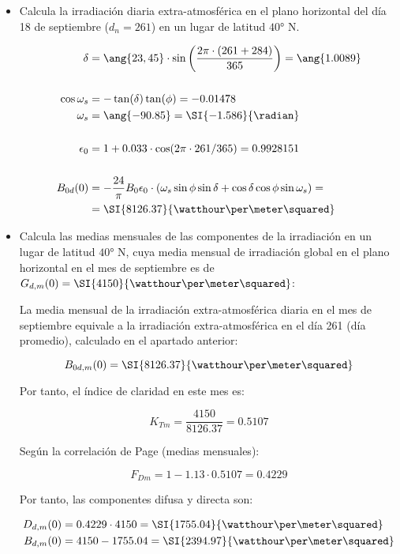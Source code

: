 \begin{itemize}
\item Calcula la irradiación diaria extra-atmosférica en el plano
  horizontal del día 18 de septiembre ($d_n = 261$) en un lugar de
  latitud $\ang{40}$ N.

\begin{align*}
  \delta &= \ang{23,45}\cdot\sin\left(\frac{2\pi\cdot\left(261+284\right)}{365}\right) = \ang{1.0089}\\
  \\
  \cos \omega_s &= -\tan(\delta) \tan(\phi) = -0.01478\\
  \omega_s &= \ang{-90.85} = \SI{-1.586}{\radian}\\
  \\
  \epsilon_0 &= 1+0.033\cdot\cos(2\pi\cdot261/365) = 0.9928151\\
  \\
  B_{0d}(0) &= -\frac{24}{\pi}B_{0}\epsilon_{0}\cdot\left(\omega_{s}\sin\phi\sin\delta+\cos\delta\cos\phi\sin\omega_{s}\right) = \\
         &= \SI{8126.37}{\watthour\per\meter\squared}
\end{align*}

\item Calcula las medias mensuales de las componentes de la
  irradiación en un lugar de latitud $\ang{40}$ N, cuya media mensual
  de irradiación global en el plano horizontal en el mes de septiembre
  es de $G_{d,m}(0) = \SI{4150}{\watthour\per\meter\squared}$:

  La media mensual de la irradiación extra-atmosférica diaria en el
  mes de septiembre equivale a la irradiación extra-atmosférica en el
  día 261 (día promedio), calculado en el apartado anterior:

\[
  B_{0d,m}(0) = \SI{8126.37}{\watthour\per\meter\squared}
\]

Por tanto, el índice de claridad en este mes es:

\[
  K_{Tm}=\frac{4150}{8126.37}=0.5107
\]

Según la correlación de Page (medias mensuales):

\[
  F_{Dm} = 1 - 1.13 \cdot 0.5107 = 0.4229
\]

Por tanto, las componentes difusa y directa son:

\begin{align*}
  D_{d,m}(0) &= 0.4229 \cdot 4150 = \SI{1755.04}{\watthour\per\meter\squared}\\
  B_{d,m}(0) &= 4150 - 1755.04 = \SI{2394.97}{\watthour\per\meter\squared}  
\end{align*}



\end{itemize}
